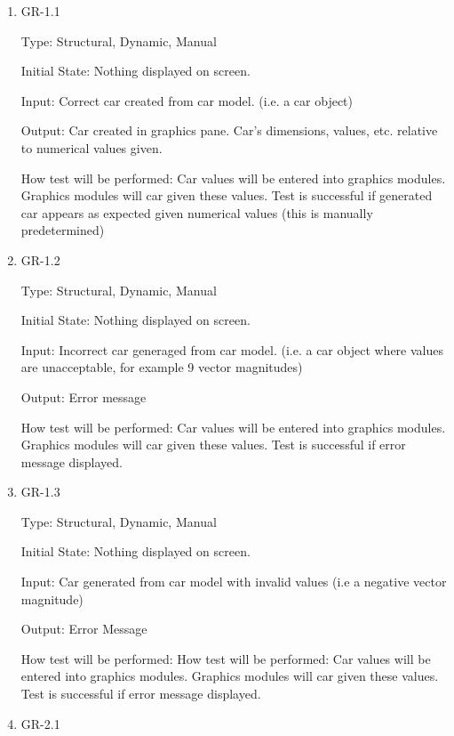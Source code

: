 \documentclass[12pt, titlepage]{article}
\begin{document}
\begin{enumerate}

\item{GR-1.1\\}

Type: Structural, Dynamic, Manual
					
Initial State: Nothing displayed on screen.
					
Input: Correct car created from car model. (i.e. a car object)
					
Output: Car created in graphics pane. Car's dimensions, values, etc. relative to numerical values given.
					
How test will be performed: Car values will be entered into graphics modules. Graphics modules will car given these values. Test is  successful if generated car appears as expected given numerical values (this is manually predetermined)

\item{GR-1.2\\}

Type: Structural, Dynamic, Manual
					
Initial State: Nothing displayed on screen.
					
Input: Incorrect car generaged from car model. (i.e. a car object where values are unacceptable, for example 9 vector magnitudes)
					
Output: Error message
					
How test will be performed: Car values will be entered into graphics modules. Graphics modules will car given these values. Test is successful if error message displayed.

\item{GR-1.3\\}

Type: Structural, Dynamic, Manual
					
Initial State: Nothing displayed on screen.
					
Input: Car generated from car model with invalid values (i.e a negative vector magnitude)
					
Output: Error Message
					
How test will be performed: How test will be performed: Car values will be entered into graphics modules. Graphics modules will car given these values. Test is successful if error message displayed.
					
\item{GR-2.1\\}


\end{enumerate}
\end{document}
